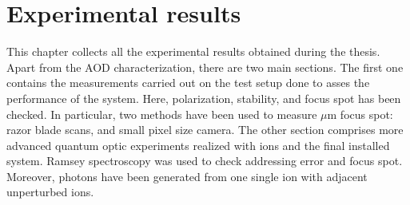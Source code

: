 
\chapter{Experimental results}
This chapter collects all the experimental results obtained during the thesis. Apart from the AOD characterization, there are two main sections. The first one contains the measurements carried out on the test setup done to asses the performance of the system. Here, polarization, stability, and focus spot has been checked. In particular, two methods have been used to measure $\mu$m focus spot: razor blade scans, and small pixel size camera. The other section comprises more advanced quantum optic experiments realized with ions and the final installed system. Ramsey spectroscopy was used to check addressing error and focus spot. Moreover, photons have been generated from one single ion with adjacent unperturbed ions.


